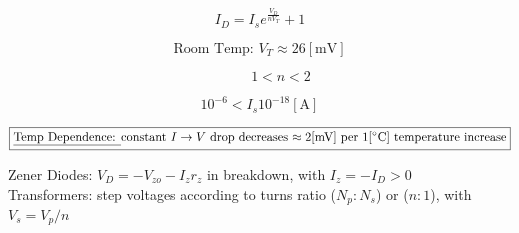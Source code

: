 \documentclass[12pt]{article}
\begin{document}
  \vspace{-25pt}

  \begin{multicols}{4}

    \begin{equation*}
      I_D=I_se^{\frac{V_D}{nV_T}}+1
    \end{equation*}

    \begin{equation*}
      \text{Room Temp: }V_T\approx 26[\si{\milli\volt}]
    \end{equation*}

    \begin{equation*}
      \quad\quad\quad1<n<2
    \end{equation*}

    \begin{equation*}
      10^{-6} <I_s 10^{-18}[\si{\ampere}]
    \end{equation*}

  \end{multicols}

  \vspace{-25pt}

  $$\boxed{\text{\underline{Temp Dependence: }constant $I\to V$ drop decreases $\approx2[\si{\milli\volt}]$ per $1[\si{\celsius}]$ temperature increase}}$$

  Zener Diodes: $V_D=-V_{zo}-I_zr_z$ in breakdown, with $I_z=-I_D>0$\\

  Transformers: step voltages according to turns ratio ($N_p:N_s$) or ($n:1$), with $V_s=V_p/n$
\end{document}
